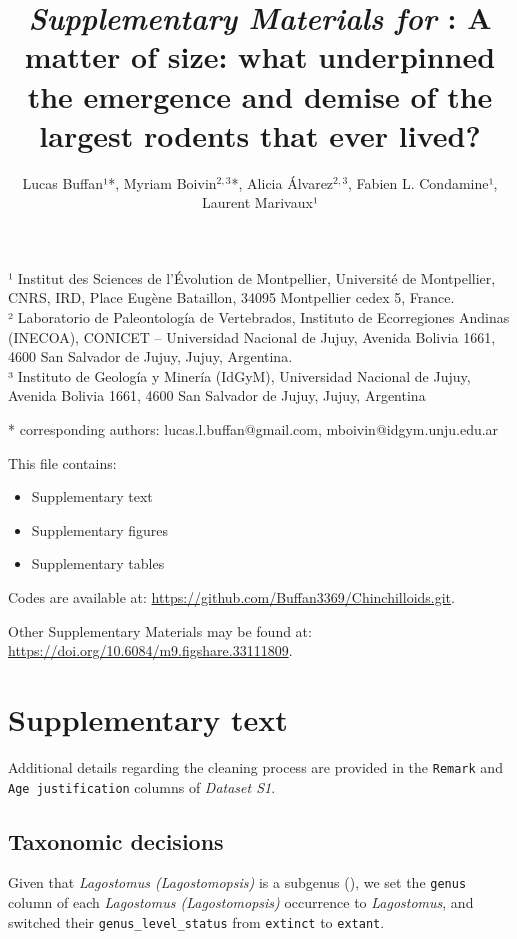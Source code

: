 \documentclass[
  9pt,
  letterpaper,
]{article}
\title{\emph{Supplementary Materials for} : A matter of size: what
underpinned the emergence and demise of the largest rodents that ever
lived?}
\author{Lucas Buffan¹*, Myriam Boivin\(^{2,3}\)*, Alicia
Álvarez\(^{2,3}\), Fabien L. Condamine¹, Laurent Marivaux¹}
\date{}
\providecommand{\tightlist}{%
  \setlength{\itemsep}{0pt}\setlength{\parskip}{0pt}}\usepackage{longtable,booktabs,array}
\begin{document}
\maketitle


¹ Institut des Sciences de l'Évolution de Montpellier, Université de
Montpellier, CNRS, IRD, Place Eugène Bataillon, 34095 Montpellier cedex
5, France.\\
² Laboratorio de Paleontología de Vertebrados, Instituto de Ecorregiones
Andinas (INECOA), CONICET -- Universidad Nacional de Jujuy, Avenida
Bolivia 1661, 4600 San Salvador de Jujuy, Jujuy, Argentina.\\
³ Instituto de Geología y Minería (IdGyM), Universidad Nacional de
Jujuy, Avenida Bolivia 1661, 4600 San Salvador de Jujuy, Jujuy,
Argentina

* corresponding authors: lucas.l.buffan@gmail.com,
mboivin@idgym.unju.edu.ar

This file contains:

\begin{itemize}
\tightlist
\item
  Supplementary text
\item
  Supplementary figures
\item
  Supplementary tables
\end{itemize}

\hfill\break

Codes are available at:
\url{https://github.com/Buffan3369/Chinchilloids.git}.

Other Supplementary Materials may be found at:
\url{https://doi.org/10.6084/m9.figshare.33111809}.

\newpage

\section{Supplementary text}\label{supplementary-text}

Additional details regarding the cleaning process are provided in the
\texttt{Remark} and \texttt{Age\ justification} columns of \emph{Dataset
S1}.

\subsection{Taxonomic decisions}\label{taxonomic-decisions}

Given that \emph{Lagostomus (Lagostomopsis)} is a subgenus
(), we set the
\texttt{genus} column of each \emph{Lagostomus (Lagostomopsis)}
occurrence to \emph{Lagostomus}, and switched their
\texttt{genus\_level\_status} from \texttt{extinct} to \texttt{extant}.
\end{document}
